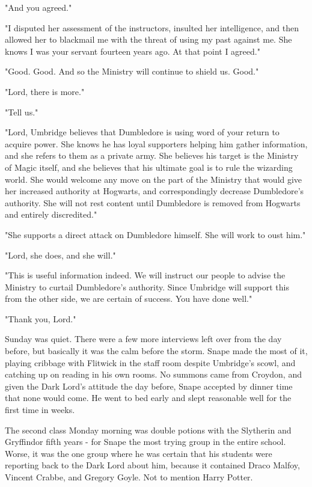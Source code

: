 \documentclass[a4paper,11pt]{article}
\begin{document}
"And you agreed."

"I disputed her assessment of the instructors, insulted her intelligence, and then allowed her to blackmail me with the threat of using my past against me. She knows I was your servant fourteen years ago. At that point I agreed."

"Good. Good. And so the Ministry will continue to shield us. Good."

"Lord, there is more."

"Tell us."

"Lord, Umbridge believes that Dumbledore is using word of your return to acquire power. She knows he has loyal supporters helping him gather information, and she refers to them as a private army. She believes his target is the Ministry of Magic itself, and she believes that his ultimate goal is to rule the wizarding world. She would welcome any move on the part of the Ministry that would give her increased authority at Hogwarts, and correspondingly decrease Dumbledore's authority. She will not rest content until Dumbledore is removed from Hogwarts and entirely discredited."

"She supports a direct attack on Dumbledore himself. She will work to oust him."

"Lord, she does, and she will."

"This is useful information indeed. We will instruct our people to advise the Ministry to curtail Dumbledore's authority. Since Umbridge will support this from the other side, we are certain of success. You have done well."

"Thank you, Lord."

Sunday was quiet. There were a few more interviews left over from the day before, but basically it was the calm before the storm. Snape made the most of it, playing cribbage with Flitwick in the staff room despite Umbridge's scowl, and catching up on reading in his own rooms. No summons came from Croydon, and given the Dark Lord's attitude the day before, Snape accepted by dinner time that none would come. He went to bed early and slept reasonable well for the first time in weeks.

The second class Monday morning was double potions with the Slytherin and Gryffindor fifth years - for Snape the most trying group in the entire school. Worse, it was the one group where he was certain that his students were reporting back to the Dark Lord about him, because it contained Draco Malfoy, Vincent Crabbe, and Gregory Goyle. Not to mention Harry Potter.
\end{document}
